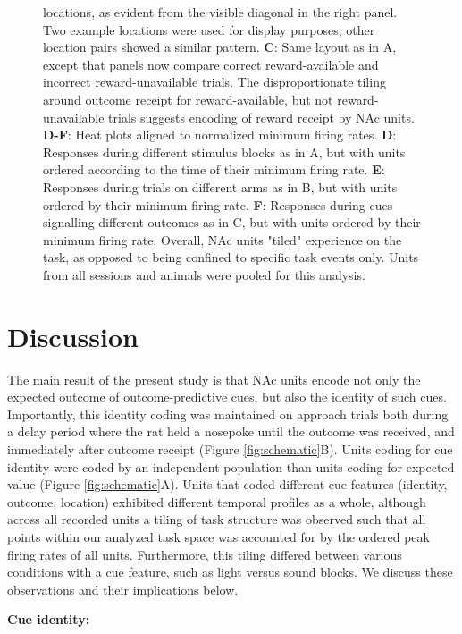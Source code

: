 \documentclass[11pt]{article}
\newcommand{\bsf}[1]{\textbf{#1}}
\begin{document}
\begin{figure}[ht!]
{locations, as evident from the visible diagonal in the right panel. Two
example locations were used for display purposes; other location pairs showed
a similar pattern. \bsf{C}: Same layout as in A, except that panels now compare
correct reward-available and incorrect reward-unavailable trials. The disproportionate tiling around outcome receipt for reward-available, but not reward-unavailable
trials suggests encoding of reward receipt by NAc units. \bsf{D-F}: Heat plots aligned to normalized minimum firing rates. \bsf{D}: Responses during different stimulus blocks as in A, but with units ordered according to
the time of their minimum firing rate. \bsf{E}: Responses during trials on different arms as in B, but with units ordered by their minimum
firing rate. \bsf{F}: Responses during cues signalling different outcomes as in C, but with units ordered by their minimum firing
rate. Overall, NAc units "tiled" experience on the task, as opposed to being
confined to specific task events only. Units from all sessions and animals
were pooled for this analysis.}
\label{fig:NP_tiling}
\end{figure} \clearpage

\section*{Discussion}

The main result of the present study is that NAc units encode not
only the expected outcome of outcome-predictive cues, but also the
identity of such cues. Importantly, this identity coding was
maintained on approach trials both during a delay period where the rat held
a nosepoke until the outcome was received, and immediately after outcome receipt (Figure
\ref{fig:schematic}B). Units coding for cue identity were coded by an independent population than units coding for expected value (Figure
\ref{fig:schematic}A). Units that coded different cue features
(identity, outcome, location) exhibited different temporal profiles as
a whole, although across all recorded units a tiling of task structure
was observed such that all points within our analyzed task space was
accounted for by the ordered peak firing rates of all
units. Furthermore, this tiling differed between various conditions
with a cue feature, such as light versus sound blocks. We discuss
these observations and their implications below.

{\bf Cue identity:}
\end{document}
